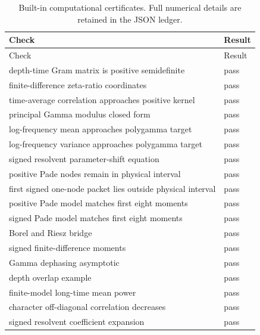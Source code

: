 \begin{longtable}{p{}p{}}
\caption{Built-in computational certificates. Full numerical details are retained in the JSON ledger.}\label{tab:checks}\\
\toprule Check & Result \\ \midrule
\endfirsthead
\toprule Check & Result \\ \midrule
\endhead
depth-time Gram matrix is positive semidefinite & pass \\
finite-difference zeta-ratio coordinates & pass \\
time-average correlation approaches positive kernel & pass \\
principal Gamma modulus closed form & pass \\
log-frequency mean approaches polygamma target & pass \\
log-frequency variance approaches polygamma target & pass \\
signed resolvent parameter-shift equation & pass \\
positive Pade nodes remain in physical interval & pass \\
first signed one-node packet lies outside physical interval & pass \\
positive Pade model matches first eight moments & pass \\
signed Pade model matches first eight moments & pass \\
Borel and Riesz bridge & pass \\
signed finite-difference moments & pass \\
Gamma dephasing asymptotic & pass \\
depth overlap example & pass \\
finite-model long-time mean power & pass \\
character off-diagonal correlation decreases & pass \\
signed resolvent coefficient expansion & pass \\
\bottomrule
\end{longtable}

